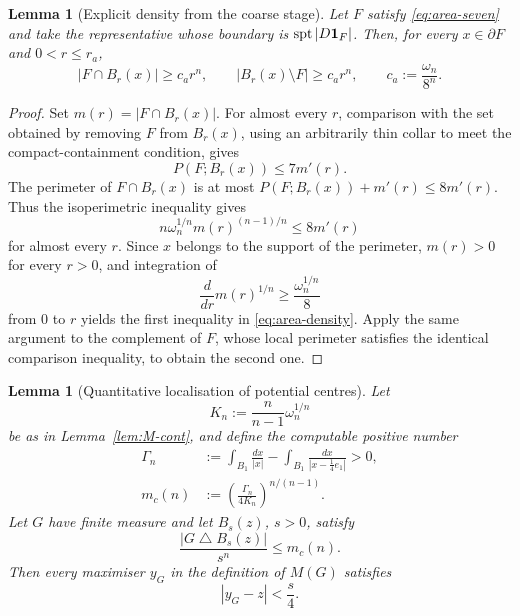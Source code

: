 \documentclass[11pt]{amsart}
\newtheorem{lemma}[theorem]{Lemma}
\theoremstyle{definition}
\newcommand{\Per}{P}
\begin{document}
\begin{lemma}[Explicit density from the coarse stage]\label{lem:area-density}
Let \(F\) satisfy \eqref{eq:area-seven} and take the representative whose
boundary is \(\operatorname{spt}|D{\bf1}_F|\).  Then, for every
\(x\in\partial F\) and \(0<r\le r_a\),
\[
   |F\cap B_r(x)|\ge c_a r^n,\qquad
   |B_r(x)\setminus F|\ge c_a r^n,
   \qquad
   c_a:=\frac{\omega_n}{8^n}.
\tag{4.69}\label{eq:area-density}
\]
\end{lemma}

\begin{proof}
Set \(m(r)=|F\cap B_r(x)|\).  For almost every \(r\), comparison with
the set obtained by removing \(F\) from \(B_r(x)\), using an arbitrarily
thin collar to meet the compact-containment condition, gives
\[
   \Per(F;B_r(x))\le7m'(r).
\]
The perimeter of \(F\cap B_r(x)\) is at most
\(\Per(F;B_r(x))+m'(r)\le8m'(r)\).  Thus the isoperimetric
inequality gives
\[
   n\omega_n^{1/n}m(r)^{(n-1)/n}\le8m'(r)
\]
for almost every \(r\).  Since \(x\) belongs to the support of the
perimeter, \(m(r)>0\) for every \(r>0\), and integration of
\[
   \frac d{dr}m(r)^{1/n}
   \ge\frac{\omega_n^{1/n}}8
\]
from \(0\) to \(r\) yields the first inequality in
\eqref{eq:area-density}.  Apply the same argument to the complement of
\(F\), whose local perimeter satisfies the identical comparison
inequality, to obtain the second one.
\end{proof}

\begin{lemma}[Quantitative localisation of potential centres]
\label{lem:potential-centre}
Let
\[
   K_n:=\frac{n}{n-1}\omega_n^{1/n}
\]
be as in Lemma~\ref{lem:M-cont}, and define the computable positive number
\[
\begin{aligned}
   \Gamma_n
   &:=
   \int_{B_1}\frac{dx}{|x|}
     -\int_{B_1}\frac{dx}{|x-\frac14 e_1|}>0,\\
   m_c(n)
   &:=
   \left(\frac{\Gamma_n}{4K_n}\right)^{n/(n-1)}.
\end{aligned}
\tag{4.70}\label{eq:Gamma-mc}
\]
Let \(G\) have finite measure and let \(B_s(z)\), \(s>0\), satisfy
\[
   \frac{|G\mathbin{\triangle}B_s(z)|}{s^n}\le m_c(n).
\tag{4.71}\label{eq:center-mismatch}
\]
Then every maximiser \(y_G\) in the definition of \(M(G)\) satisfies
\[
   |y_G-z|<\frac{s}{4}.
\tag{4.72}\label{eq:center-localised}
\]
\end{lemma}
\end{document}
